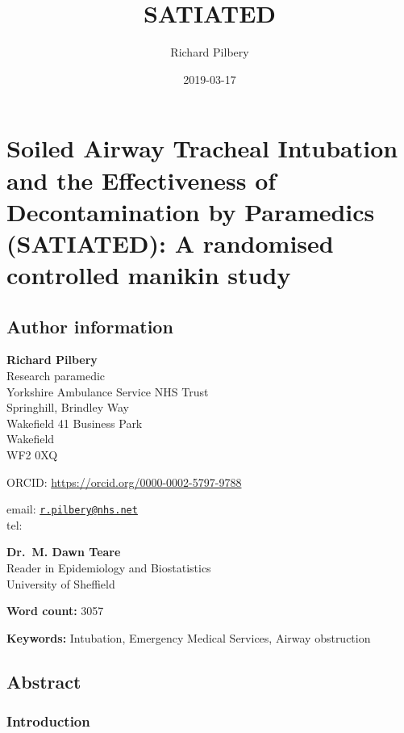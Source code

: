 \documentclass[]{article}
\title{SATIATED}
\author{Richard Pilbery}
\date{2019-03-17}
\begin{document}
\maketitle

\hypertarget{soiled-airway-tracheal-intubation-and-the-effectiveness-of-decontamination-by-paramedics-satiated-a-randomised-controlled-manikin-study}{%
\section{Soiled Airway Tracheal Intubation and the Effectiveness of
Decontamination by Paramedics (SATIATED): A randomised controlled
manikin
study}\label{soiled-airway-tracheal-intubation-and-the-effectiveness-of-decontamination-by-paramedics-satiated-a-randomised-controlled-manikin-study}}

\hypertarget{author-information}{%
\subsection{Author information}\label{author-information}}

\textbf{Richard Pilbery}\\
Research paramedic\\
Yorkshire Ambulance Service NHS Trust\\
Springhill, Brindley Way\\
Wakefield 41 Business Park\\
Wakefield\\
WF2 0XQ

ORCID: \url{https://orcid.org/0000-0002-5797-9788}

email: \href{mailto:r.pilbery@nhs.net}{\nolinkurl{r.pilbery@nhs.net}}\\
tel:

\textbf{Dr.~M. Dawn Teare}\\
Reader in Epidemiology and Biostatistics\\
University of Sheffield

\textbf{Word count:} 3057

\textbf{Keywords:} Intubation, Emergency Medical Services, Airway
obstruction

\hypertarget{abstract}{%
\subsection{Abstract}\label{abstract}}

\hypertarget{introduction}{%
\subsubsection{Introduction}\label{introduction}}
\end{document}
